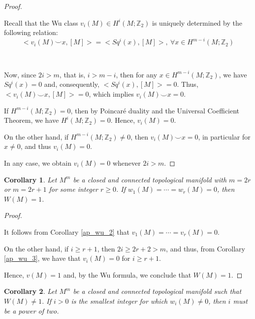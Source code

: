 \documentclass[12pt,oneside]{book}
\newtheorem{cor}    {Corollary}[chapter]
\newcommand{\Z}{\mathbb{Z}}
\newcommand{\ccup}{\smile}
\begin{document}
    \begin{proof}

        \

    	Recall that the Wu class $v_{i}(M)\in H^{i}(M;\Z_{2})$ is uniquely determined by the following relation:
    	$$ <v_{i}(M)\ccup x,[M]>=<Sq^{i}(x),[M]>, \ \forall x\in H^{m-i}(M;\Z_{2}) $$

        \

    	Now, since $2i>m$, that is, $i>m-i$, then for any $x\in H^{m-i}(M;\Z_{2})$, we have $Sq^{i}(x)=0$ and, consequently, 
        $<Sq^{i}(x),[M]>=0$. Thus, $<v_{i}(M)\ccup x,[M]>=0$, which implies $v_{i}(M)\ccup x=0$.

    	If $H^{m-i}(M;\Z_{2})=0$, then by Poincaré duality and the Universal Coefficient 
        Theorem, we have $H^{i}(M;\Z_{2})=0$. Hence, $v_{i}(M)=0$.

    	On the other hand, if $H^{m-i}(M;\Z_{2})\neq 0$, then $v_{i}(M)\ccup x=0$, in particular for $x\neq 0$, and thus $v_{i}(M)=0$.

    	In any case, we obtain $v_{i}(M)=0$ whenever $2i>m$.

    \end{proof}

    \begin{cor}\label{ap_wu_4}
	Let $M^{m}$ be a closed and connected topological manifold with $m=2r$ or $m=2r+1$ for some integer $r\geq 0$. If 
    $w_{1}(M)=\cdots=w_{r}(M)=0$, then $W(M)=1$.
    \end{cor}

    \begin{proof}

        \

    	It follows from Corollary \ref{ap_wu_2} that $v_{1}(M)=\cdots=v_{r}(M)=0$.

    	On the other hand, if $i\geq r+1$, then $2i\geq 2r+2>m$, and thus, from Corollary \ref{ap_wu_3}, we have that $v_{i}(M)=0$ for 
        $i\geq r+1$.

    	Hence, $v(M)=1$ and, by the Wu formula, we conclude that $W(M)=1$.

    \end{proof}

    \begin{cor}\label{ap_wu_5}
    	Let $M^{m}$ be a closed and connected topological manifold such that $W(M)\neq 1$. If $i>0$ is the smallest integer for which 
        $w_{i}(M)\neq 0$, then $i$ must be a power of two.
    \end{cor}
\end{document}
